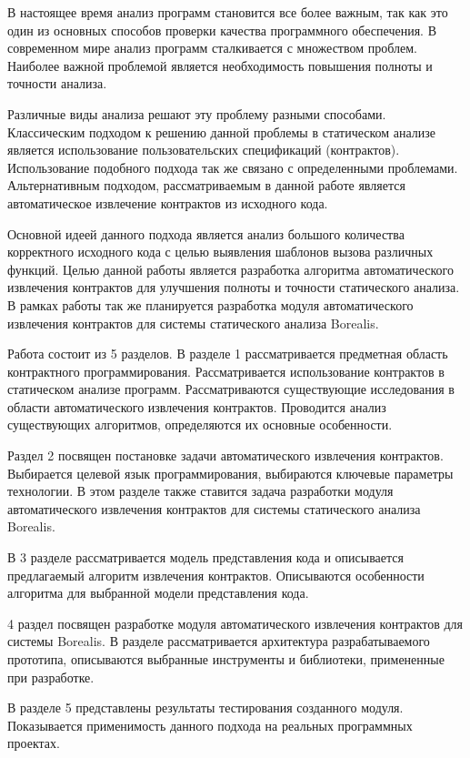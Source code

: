 \intro
В настоящее время анализ программ становится все более важным, так как это один из основных способов проверки качества программного обеспечения. В современном мире анализ программ сталкивается с множеством проблем.  Наиболее важной проблемой является необходимость повышения полноты и точности анализа.

Различные виды анализа решают эту проблему разными способами. Классическим подходом к решению данной проблемы в статическом анализе является использование пользовательских спецификаций (контрактов). Использование подобного подхода так же связано с определенными проблемами. Альтернативным подходом, рассматриваемым в данной работе является автоматическое извлечение контрактов из исходного кода.

Основной идеей данного подхода является анализ большого количества корректного исходного кода с целью выявления шаблонов вызова различных функций. Целью данной работы является разработка алгоритма автоматического извлечения контрактов для улучшения полноты и точности статического анализа. В рамках работы так же планируется разработка модуля автоматического извлечения контрактов для системы статического анализа Borealis\cite{borealis}.

Работа состоит из 5 разделов. В разделе 1 рассматривается предметная область контрактного программирования. Рассматривается использование контрактов в статическом анализе программ. Рассматриваются существующие исследования в области автоматического извлечения контрактов. Проводится анализ существующих алгоритмов, определяются их основные особенности.

Раздел 2 посвящен постановке задачи автоматического извлечения контрактов. Выбирается целевой язык программирования, выбираются ключевые параметры технологии. В этом разделе также ставится задача разработки модуля автоматического извлечения контрактов для системы статического анализа Borealis.

В 3 разделе рассматривается модель представления кода и описывается предлагаемый алгоритм извлечения контрактов. Описываются особенности алгоритма для выбранной модели представления кода.

4 раздел посвящен разработке модуля автоматического извлечения контрактов для системы Borealis. В разделе рассматривается архитектура разрабатываемого прототипа, описываются выбранные инструменты и библиотеки, примененные при разработке.

В разделе 5 представлены результаты тестирования созданного модуля. Показывается применимость данного подхода на реальных программных проектах.
